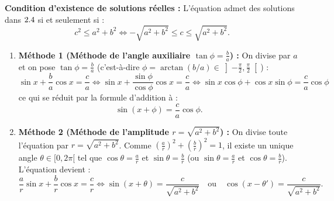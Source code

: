 \begin{theoreme}[Résolution de l'équation linéaire $a\sin x + b\cos x = c$]
\textbf{Condition d'existence de solutions réelles :} L'équation admet des solutions dans $2.4$ si et seulement si :
\[
    \boxed{c^2 \le a^2 + b^2 \iff -\sqrt{a^2+b^2} \le c \le \sqrt{a^2+b^2}}.
\]
\begin{enumerate}
    \item \textbf{Méthode 1 (Méthode de l'angle auxiliaire $\tan\phi = \frac{b}{a}$) :}
    On divise par $a$ et on pose $\tan\phi = \frac{b}{a}$ (c'est-à-dire $\phi = \arctan(b/a) \in \left]-\frac{\pi}{2}, \frac{\pi}{2}\right[$) :
    \[
        \sin x + \frac{b}{a}\cos x = \frac{c}{a} \iff \sin x + \frac{\sin\phi}{\cos\phi}\cos x = \frac{c}{a} \iff \sin x\cos\phi + \cos x\sin\phi = \frac{c}{a}\cos\phi
    \]
    ce qui se réduit par la formule d'addition à :
    \[
        \boxed{\sin(x + \phi) = \frac{c}{a}\cos\phi}.
    \]
    \item \textbf{Méthode 2 (Méthode de l'amplitude $r = \sqrt{a^2+b^2}$) :}
    On divise toute l'équation par $r = \sqrt{a^2 + b^2}$. Comme $\left(\frac{a}{r}\right)^2 + \left(\frac{b}{r}\right)^2 = 1$, il existe un unique angle $\theta \in [0, 2\pi[$ tel que $\cos\theta = \frac{a}{r}$ et $\sin\theta = \frac{b}{r}$ (ou $\sin\theta = \frac{a}{r}$ et $\cos\theta = \frac{b}{r}$). L'équation devient :
    \[
        \frac{a}{r}\sin x + \frac{b}{r}\cos x = \frac{c}{r} \iff \boxed{\sin(x + \theta) = \frac{c}{\sqrt{a^2+b^2}} \quad \text{ou} \quad \cos(x - \theta') = \frac{c}{\sqrt{a^2+b^2}}}.
    \]
\end{enumerate}
\end{theoreme}

